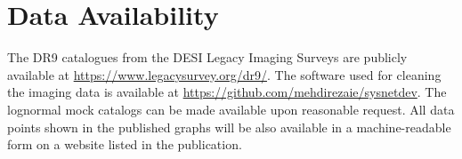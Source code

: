 \section*{Data Availability}
\label{sec:dataavail}
The DR9 catalogues from the DESI Legacy Imaging Surveys are publicly available at \href{https://www.legacysurvey.org/dr9/}{https://www.legacysurvey.org/dr9/}. The software used for cleaning the imaging data is available at \href{https://github.com/mehdirezaie/sysnetdev}{https://github.com/mehdirezaie/sysnetdev}. The lognormal mock catalogs can be made available upon reasonable request. All data points shown in the published graphs will be also available in a machine-readable form on a website listed in the publication.